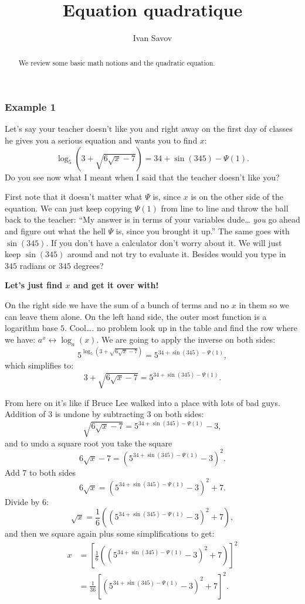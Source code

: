 \documentclass[journal]{IEEEtran}
\title{ \Huge Equation quadratique}
\author{Ivan Savov}
\newcommand{\dokutitlelevelfour}[1]{\subsubsection{#1}}
\newcommand{\dokubold}[1]{\textbf{#1}}
\newcommand{\dokuitalic}[1]{\textsl{#1}}
\begin{document}
\maketitle


\begin{abstract}
We review some basic math notions and the 
quadratic equation.
\end{abstract}





\dokutitlelevelfour{Example 1}

Let's say your teacher doesn't like you and right away on the first day of classes he gives you 
a serious equation and wants you to find \(x\):
\[
   \log_5\left(3 + \sqrt{6\sqrt{x}-7}   \right) = 34+\sin(345)-\Psi(1).
\]
Do you see now what I meant when I said that the teacher doesn't like you?

First note that it doesn't matter what \(\Psi\) is, since \(x\) is on the other 
side of the equation. We can just keep copying \(\Psi(1)\) from line to line
and throw the ball back to the teacher: ``My answer is in terms of your variables dude\ldots{} \dokuitalic{you} go ahead and figure out what the hell \(\Psi\) is,
since you brought it up.''
The same goes with \(\sin(345)\). If you don't have a calculator don't worry about it. 
We will just keep \(\sin(345)\) around and not try to evaluate it.
Besides would you type in \(345\) radians or \(345\) degrees?


\dokubold{Let's just find \(x\) and get it over with!}

On the right side we have the sum of a bunch of terms and no \(x\) in them so we can leave them alone.
On the left hand side, the outer most function is a logarithm base \(5\). 
Cool\ldots{}. no problem look up in the table and find the 
row where we have: \(a^x \leftrightarrow \log_a(x)\).
We are going to apply the inverse on both sides:
\[
   5^{ \log_5\left(3 + \sqrt{6\sqrt{x}-7}   \right) }  = 5^{ 34+\sin(345)-\Psi(1) },
\]
which simplifies to:
\[
  3 + \sqrt{6\sqrt{x}-7} = 5^{ 34+\sin(345)-\Psi(1) }.
\]

From here on it's like if Bruce Lee walked into a place with lots of bad guys. Addition of 3 is undone by subtracting \(3\) on both sides:
\[
  \sqrt{6\sqrt{x}-7} = 5^{ 34+\sin(345)-\Psi(1) } - 3,
\]
and to undo a square root you take the square
\[
  6\sqrt{x}-7 = \left(5^{ 34+\sin(345)-\Psi(1) } - 3\right)^2.
\]
Add \(7\) to both sides
\[
  6\sqrt{x} = \left(5^{ 34+\sin(345)-\Psi(1) } - 3\right)^2+7.
\]
Divide by \(6\):
\[
  \sqrt{x} = \frac{1}{6}\left(\left(5^{ 34+\sin(345)-\Psi(1) } - 3\right)^2+7\right),
\]
and then we square again plus some simplifications to get:
\begin{align*}
  x 
 &= \left[\frac{1}{6}\left(\left(5^{ 34+\sin(345)-\Psi(1) } - 3\right)^2+7\right) \right]^2  \\
 &= \frac{1}{36}\left[\left(5^{ 34+\sin(345)-\Psi(1) } - 3\right)^2+7\right]^2.
\end{align*}
\end{document}
